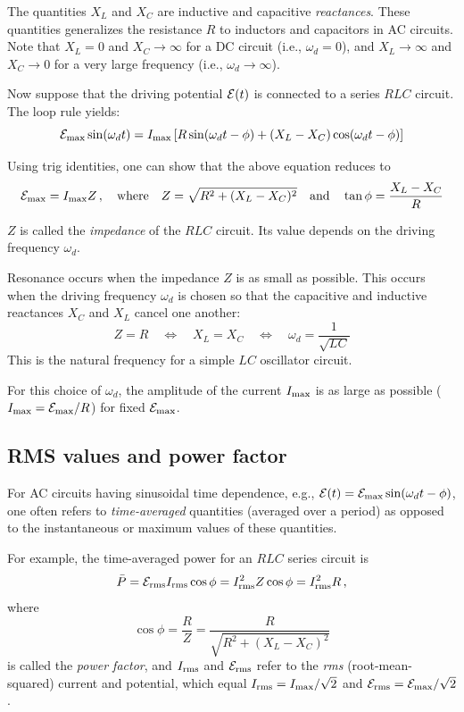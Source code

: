 \documentclass[10pt,twoside]{article}
\def\be{\begin{equation}}
\def\ee{\end{equation}}
\def\i{\item{}}
\begin{document}
\i The quantities $X_L$ and $X_C$ are inductive and capacitive {\it reactances}.
These quantities generalizes the resistance $R$ to inductors and capacitors in 
AC circuits.
Note that $X_L=0$ and $X_C\to\infty$ for a DC circuit (i.e., $\omega_d=0$),
and $X_L\to\infty$ and $X_C\to 0$ for a very large frequency (i.e., $\omega_d\to \infty$).

\i Now suppose that the driving potential ${\cal E}(t)$ is connected to 
a series $RLC$ circuit.
The loop rule yields:
\be
{\cal E}_{\rm max}\sin(\omega_d t) 
=I_{\rm max}\left[R\sin(\omega_d t-\phi) + (X_L-X_C)\cos(\omega_d t- \phi) \right]
\ee

\i Using trig identities, one can show that the above equation reduces to
%
\be
{\cal E}_{\rm max} = I_{\rm max} Z\,,
\quad{\rm where}\quad
Z = \sqrt{R^2 + (X_L-X_C)^2}
\quad{\rm and}\quad
\tan\phi = \frac{X_L-X_C}{R}
\ee
%

\i $Z$ is called the {\it impedance} of the $RLC$ circuit. 
Its value depends on the driving frequency $\omega_d$.

\i Resonance occurs when the impedance $Z$ is as small as possible.
This occurs when the driving frequency $\omega_d$ is chosen so that
the capacitive and inductive reactances $X_C$ and $X_L$ cancel one another:
\be
Z = R
\quad\iff\quad
X_L = X_C
\quad\iff\quad
\omega_d = \frac{1}{\sqrt{LC}}
\ee
%
This is the natural frequency for a simple $LC$ oscillator circuit.

\i For this choice of $\omega_d$, the amplitude of the current 
$I_{\rm max}$
is as large as possible ($I_{\rm max} = {\cal E}_{\rm max}/R$) 
for fixed ${\cal E}_{\rm max}$.

\subsection{RMS values and power factor}

\i For AC circuits having sinusoidal time dependence, 
e.g., ${\cal E}(t) = {\cal E}_{\rm max}\sin(\omega_d t-\phi)$,
one often refers to {\it time-averaged} quantities (averaged over a period) as
opposed to the instantaneous or maximum values of these quantities.

\i For example, the time-averaged power for an $RLC$ series circuit is 
%
\be 
\bar P 
= {\cal E}_{\rm rms} I_{\rm rms}\cos\phi 
= I_{\rm rms}^2 Z \cos\phi 
= I_{\rm rms}^2 R\,,
\ee
%
where
%
\be
\cos\phi = \frac{R}{Z} = \frac{R}{\sqrt{R^2 + (X_L-X_C)^2}}
\ee
%
is called the {\it power factor}, and $I_{\rm rms}$ and 
${\cal E}_{\rm rms}$ refer to the 
{\it rms} (root-mean-squared) current and potential, 
which equal $I_{\rm rms} = {I_{\rm max}}/\sqrt{2}$ and
${\cal E}_{\rm rms} = {\cal E}_{\rm max}/\sqrt{2}$.
\end{document}
